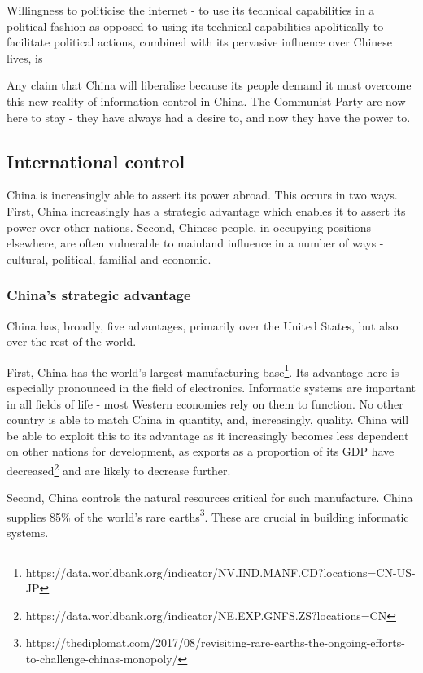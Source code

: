 Willingness to politicise the internet - to use its technical
capabilities in a political fashion as opposed to using its technical
capabilities apolitically to facilitate political actions, combined with
its pervasive influence over Chinese lives, is

Any claim that China will liberalise because its people demand it must
overcome this new reality of information control in China. The Communist
Party are now here to stay - they have always had a desire to, and now
they have the power to.

\subsection{International control}\label{international-control}

China is increasingly able to assert its power abroad. This occurs in
two ways. First, China increasingly has a strategic advantage which
enables it to assert its power over other nations. Second, Chinese
people, in occupying positions elsewhere, are often vulnerable to
mainland influence in a number of ways - cultural, political, familial
and economic.

\subsubsection{China's strategic
advantage}\label{chinas-strategic-advantage}

China has, broadly, five advantages, primarily over the United States,
but also over the rest of the world.

First, China has the world's largest manufacturing base\footnote{https://data.worldbank.org/indicator/NV.IND.MANF.CD?locations=CN-US-JP}.
Its advantage here is especially pronounced in the field of electronics.
Informatic systems are important in all fields of life - most Western
economies rely on them to function. No other country is able to match
China in quantity, and, increasingly, quality. China will be able to
exploit this to its advantage as it increasingly becomes less dependent
on other nations for development, as exports as a proportion of its GDP
have decreased\footnote{https://data.worldbank.org/indicator/NE.EXP.GNFS.ZS?locations=CN}
and are likely to decrease further.

Second, China controls the natural resources critical for such
manufacture. China supplies 85\% of the world's rare earths\footnote{https://thediplomat.com/2017/08/revisiting-rare-earths-the-ongoing-efforts-to-challenge-chinas-monopoly/}.
These are crucial in building informatic systems.

